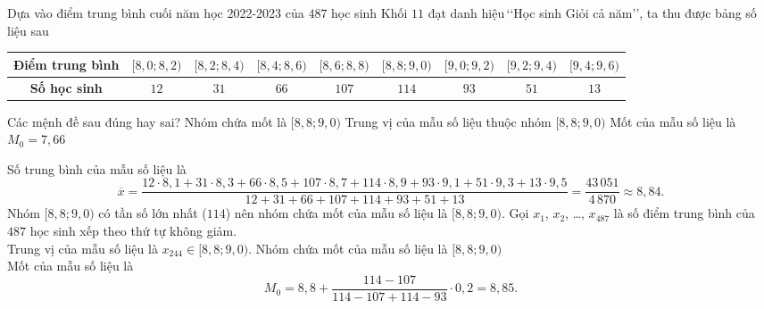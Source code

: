 \begin{vd}[Mức độ 2]%
	Dựa vào điểm trung bình cuối năm học 2022-2023 của $487$ học sinh Khối $11$ đạt danh hiệu\,\lq\lq Học sinh Giỏi cả năm\rq\rq, ta thu được bảng số liệu sau
	\begin{center}
		\begin{tabular}{|c|c|c|c|c|c|c|c|c|}
			\hline
			\textbf{Điểm trung bình}& $[8{,}0;8{,}2)$ & $[8{,}2;8{,}4)$ & $[8{,}4;8{,}6)$ & $[8{,}6;8{,}8)$ & $[8{,}8;9{,}0)$ & $[9{,}0;9{,}2)$ & $[9{,}2;9{,}4)$ & $[9{,}4;9{,}6)$\\
			\hline
			\textbf{Số học sinh}	& $12$ & $31$ & $66$ & $107$ & $114$ & $93$ & $51$ & $13$ \\
			\hline
		\end{tabular}
	\end{center}
	Các mệnh đề sau đúng hay sai?
	{\True Nhóm chứa mốt là $[8{,}8;9{,}0)$}
	{\True Trung vị của mẫu số liệu thuộc nhóm $[8{,}8;9{,}0)$}
	{Mốt của mẫu số liệu là $M_0=7{,}66$}
	\loigiai 
	{\begin{itemchoice}
			\itemch 
			Số trung bình của mẫu số liệu là
			\[\overline{x}=\dfrac{12\cdot8{,}1+31\cdot8{,}3+66\cdot8{,}5+107\cdot8{,}7+114\cdot8{,}9+93\cdot9{,}1+51\cdot9{,}3+13\cdot9{,}5}{12+31+66+107+114+93+51+13}=\dfrac{43\,051}{4\,870}\approx8{,}84.\]
			\itemch 
			Nhóm $[8{,}8;9{,}0)$ có tần số lớn nhất ($114$) nên nhóm chứa mốt của mẫu số liệu là $[8{,}8;9{,}0)$.
			\itemch 
			Gọi $x_1$, $x_2$, \ldots, $x_{487}$ là số điểm trung bình của $487$ học sinh xếp theo thứ tự không giảm.\\
			Trung vị của mẫu số liệu là $x_{244}\in[8{,}8;9{,}0)$.
			\itemch 
			Nhóm chứa mốt của mẫu số liệu là $[8{,}8;9{,}0)$\\
			Mốt của mẫu số liệu là
			\[M_0=8{,}8+\dfrac{114-107}{114-107+114-93}\cdot 0{,}2=8{,}85.\]
		\end{itemchoice}}
\end{vd}

